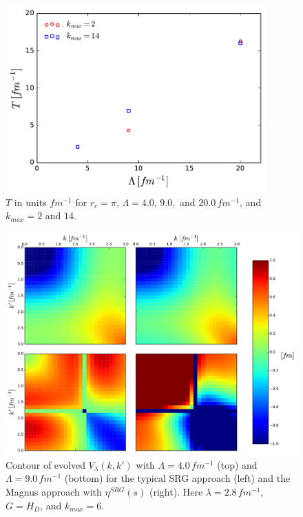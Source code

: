 \documentclass[preprintnumbers,floatfix,aps,prc,preprint]{revtex4-1}
\begin{document}
\newpage

%
\begin{figure}[H]
  \centering
  \includegraphics[width=10cm]{T_values_Wendt_Wegner}
   \hspace*{0.05\textwidth}%
  \caption{$T$ in units $fm^{-1}$ for $r_c=\pi$, $\Lambda = 4.0, \, 9.0,$ and $20.0 \, fm^{-1}$, and $k_{max}=2$ and $14$.}
  \label{fig:T_values_Wendt_Wegner}
\end{figure}
%
\begin{figure}[H]
  \centering
  \includegraphics[width=15cm]{srg_gen_with_magnus_Wendt}
   \hspace*{0.05\textwidth}%
  \caption{Contour of evolved $V_{\lambda}(k,k')$ with $\Lambda=4.0\,fm^{-1}$ (top) and $\Lambda=9.0\,fm^{-1}$ (bottom) for the typical SRG approach (left) and the Magnus approach with $\eta^{SRG}(s)$ (right). Here $\lambda = 2.8 \, fm^{-1}$, $G=H_{D}$, and $k_{max}=6$.}
  \label{fig:srg_gen_with_magnus_Wendt}
\end{figure}
\end{document}
